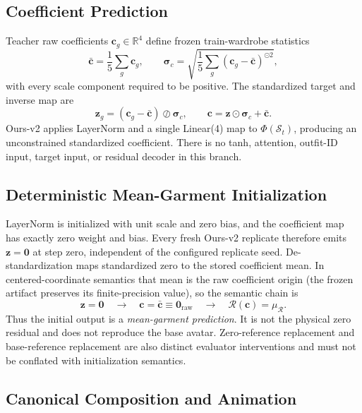 \subsection{Coefficient Prediction}

Teacher raw coefficients $\mathbf c_g\in\mathbb{R}^{4}$ define frozen train-wardrobe statistics
\begin{equation}
\bar{\mathbf c}=\frac{1}{5}\sum_g\mathbf c_g,
\qquad
\boldsymbol{\sigma}_{c}=\sqrt{\frac{1}{5}\sum_g(\mathbf c_g-\bar{\mathbf c})^{\odot 2}},
\end{equation}
with every scale component required to be positive. The standardized target and inverse map are
\begin{equation}
\mathbf z_g=(\mathbf c_g-\bar{\mathbf c})\oslash\boldsymbol{\sigma}_{c},
\qquad
\mathbf c=\mathbf z\odot\boldsymbol{\sigma}_{c}+\bar{\mathbf c}.
\end{equation}
Ours-v2 applies LayerNorm and a single Linear(4) map to $\Phi(\mathcal S_t)$, producing an unconstrained standardized coefficient. There is no tanh, attention, outfit-ID input, target input, or residual decoder in this branch.

\subsection{Deterministic Mean-Garment Initialization}

LayerNorm is initialized with unit scale and zero bias, and the coefficient map has exactly zero weight and bias. Every fresh Ours-v2 replicate therefore emits $\mathbf z=\mathbf 0$ at step zero, independent of the configured replicate seed. De-standardization maps standardized zero to the stored coefficient mean. In centered-coordinate semantics that mean is the raw coefficient origin (the frozen artifact preserves its finite-precision value), so the semantic chain is
\begin{equation}
\mathbf z=\mathbf 0
\quad\longrightarrow\quad
\mathbf c=\bar{\mathbf c}\equiv\mathbf 0_{\mathrm{raw}}
\quad\longrightarrow\quad
\mathcal R(\mathbf c)=\mu_{\mathcal R}.
\end{equation}
Thus the initial output is a \emph{mean-garment prediction}. It is not the physical zero residual and does not reproduce the base avatar. Zero-reference replacement and base-reference replacement are also distinct evaluator interventions and must not be conflated with initialization semantics.

\subsection{Canonical Composition and Animation}

